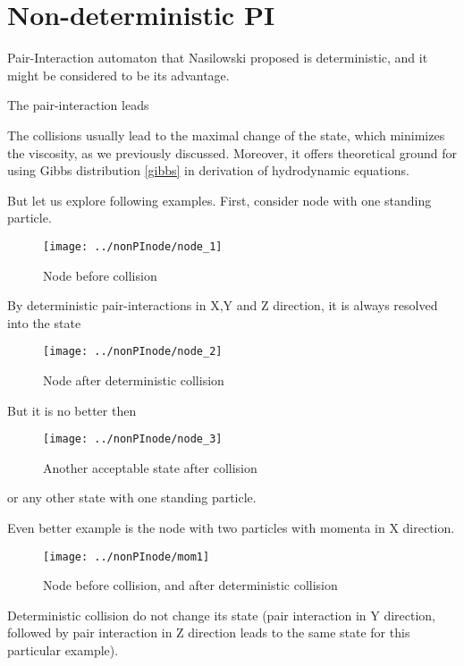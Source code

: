 \chapter{Non-deterministic PI}

Pair-Interaction automaton that Nasilowski proposed is deterministic, and it might be considered to be its advantage.

The pair-interaction leads 

The collisions usually lead to the maximal change of the state, which minimizes the viscosity, as we previously discussed.
Moreover, it offers theoretical ground for using Gibbs distribution \ref{gibbs} in derivation of hydrodynamic equations.

\bigskip

But let us explore following examples.
First, consider node with one standing particle.
\begin{figure}[h]
 \centering 
 \texttt{[image: ../nonPInode/node\_1]}
 \label{transitions}
 \caption{Node before collision}
\end{figure}

By deterministic pair-interactions in X,Y and Z direction, it is always resolved into the state
\begin{figure}[h]
 \centering 
 \texttt{[image: ../nonPInode/node\_2]}
 \label{transitions}
 \caption{Node after deterministic collision}
\end{figure}

But it is no better then

\begin{figure}[h]
 \centering 
 \texttt{[image: ../nonPInode/node\_3]}
 \label{transitions}
 \caption{Another acceptable state after collision}
\end{figure}

or any other state with one standing particle.

\bigskip
\newpage
Even better example is the node with two particles with momenta in X direction.
\begin{figure}[htbp]
 \centering 
 \texttt{[image: ../nonPInode/mom1]}
 \label{transitions}
 \caption{Node before collision, and after deterministic collision}
\end{figure}

Deterministic collision do not change its state (pair interaction in Y direction, followed by pair interaction in Z direction leads to the same state for this particular example).

